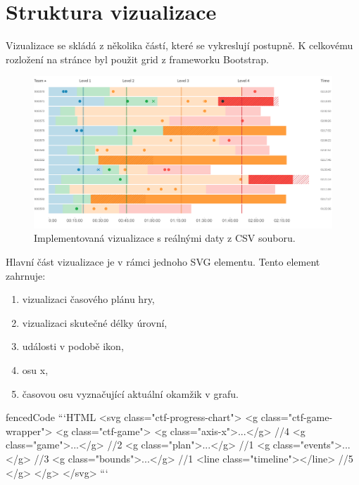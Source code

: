 \documentclass[
  digital, %
  oneside, %
  table,   %
  nolof,     %
  nolot,     %
]{fithesis3}
\begin{document}
\section{Struktura vizualizace}
Vizualizace se skládá z několika částí, které se vykreslují postupně. K celkovému rozložení na stránce byl použit grid z frameworku Bootstrap.

\begin{figure}[H]
  \begin{center}
    \includegraphics[width=12.7cm]{images/ctf-all.pdf}
  \end{center}
  \caption{Implementovaná vizualizace s reálnými daty z CSV souboru.}
  \label{fig:visualizationChart}
\end{figure}

Hlavní část vizualizace je v rámci jednoho SVG elementu. Tento element zahrnuje:
\begin{enumerate}
  \item vizualizaci časového plánu hry,
  \item vizualizaci skutečné délky úrovní,
  \item události v podobě ikon,
  \item osu x,
  \item časovou osu vyznačující aktuální okamžik v grafu.
\end{enumerate}

\begin{markdown*}{
  fencedCode
}
```HTML
	<svg class="ctf-progress-chart">
	   <g class="ctf-game-wrapper">
	      <g class="ctf-game">
	         <g class="axis-x">...</g>		  //4
	         <g class="game">...</g>		  //2
	         <g class="plan">...</g>		  //1
	         <g class="events">...</g>		  //3
	         <g class="bounds">...</g>		  //1
	         <line class="timeline"></line>	  //5
	      </g>
	   </g>
	</svg>
```
\end{markdown*}
\end{document}
